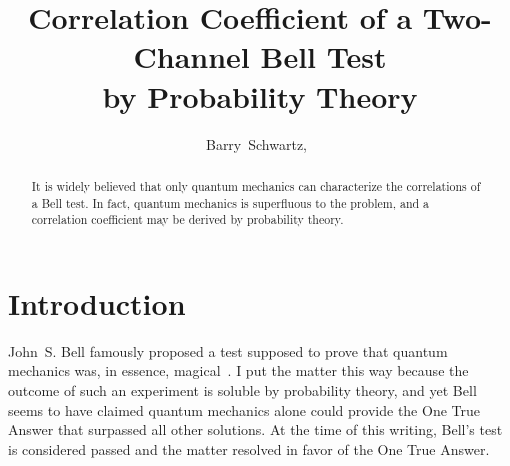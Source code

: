\documentclass[9pt,technote]{IEEEtran}
\begin{document}
\title{Correlation Coefficient of a Two-Channel Bell Test\\by
  Probability Theory}
\author{Barry~Schwartz,~}

\maketitle
\insert{}

\begin{abstract}
  It is widely believed that only quantum mechanics can characterize
  the correlations of a Bell test. In fact, quantum mechanics is
  superfluous to the problem, and a correlation coefficient may be
  derived by probability theory.
\end{abstract}

\section{Introduction}

John~S. Bell famously proposed a test supposed to prove that quantum
mechanics was, in essence, magical~\cite{enwiki:1174875317}. I put the
matter this way because the outcome of such an experiment is soluble by
probability theory, and yet Bell seems to have claimed quantum
mechanics alone could provide the One True Answer that surpassed all
other solutions. At the time of this writing, Bell's test is
considered passed and the matter resolved in favor of the One True
Answer.
\end{document}
